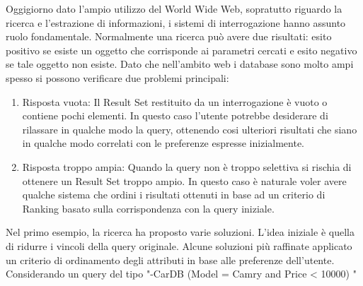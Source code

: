 Oggigiorno dato l'ampio utilizzo del World Wide Web, sopratutto riguardo la ricerca e l'estrazione di informazioni, i sistemi di interrogazione hanno assunto ruolo fondamentale.
Normalmente una ricerca può avere due risultati: esito positivo se esiste un oggetto che corrisponde ai parametri cercati e esito negativo se tale oggetto non esiste.
Dato che nell'ambito web i database sono molto ampi spesso si possono verificare due problemi principali:
\begin{enumerate}
    \item Risposta vuota: Il Result Set restituito da un interrogazione è vuoto o contiene pochi elementi. In questo caso l'utente potrebbe desiderare di rilassare in qualche modo la query, ottenendo cosi ulteriori risultati che siano in qualche modo correlati con le preferenze espresse inizialmente.
    \item Risposta troppo ampia: Quando la query non è troppo selettiva si rischia di ottenere un Result Set troppo ampio. In questo caso è naturale voler avere qualche sistema che ordini i risultati ottenuti in base ad un criterio di Ranking basato sulla corrispondenza con la query iniziale.
\end{enumerate}

Nel primo esempio, la ricerca ha proposto varie soluzioni. L'idea iniziale è quella di ridurre i vincoli della query originale. Alcune soluzioni più raffinate applicato un criterio di ordinamento degli attributi in base alle preferenze dell'utente. Considerando un query del tipo "-CarDB (Model = Camry and Price < 10000) " 